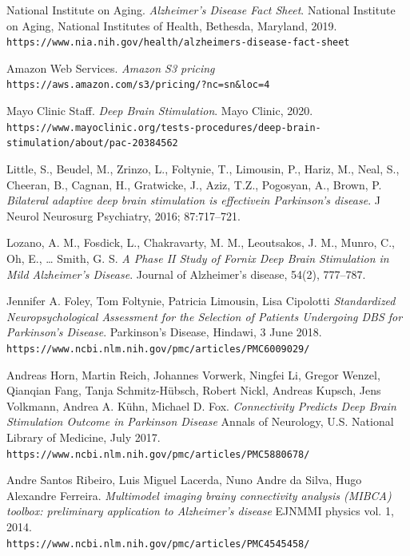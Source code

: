 \documentclass{article}
\begin{document}
\begin{thebibliography}{9}

National Institute on Aging. 
\textit{Alzheimer's Disease Fact Sheet}. 
National Institute on Aging, National Institutes of Health, Bethesda, Maryland, 2019.
\\\texttt{https://www.nia.nih.gov/health/alzheimers-disease-fact-sheet}

Amazon Web Services.
\textit{Amazon S3 pricing}
\\\texttt{https://aws.amazon.com/s3/pricing/?nc=sn\&loc=4}

Mayo Clinic Staff. 
\textit{Deep Brain Stimulation}. 
Mayo Clinic, 2020.
\\\texttt{https://www.mayoclinic.org/tests-procedures/deep-brain-stimulation/about/pac-20384562}

Little, S., Beudel, M., Zrinzo, L., Foltynie, T., Limousin, P., Hariz, M., Neal, S., Cheeran, B., Cagnan, H., Gratwicke, J., Aziz, T.Z., Pogosyan, A., Brown, P. 
\textit{Bilateral adaptive deep brain stimulation is effectivein Parkinson’s disease}. 
J Neurol Neurosurg Psychiatry, 2016; 87:717–721.

Lozano, A. M., Fosdick, L., Chakravarty, M. M., Leoutsakos, J. M., Munro, C., Oh, E., … Smith, G. S. 
\textit{A Phase II Study of Fornix Deep Brain Stimulation in Mild Alzheimer’s Disease}. 
Journal of Alzheimer's disease, 54(2), 777–787. 

Jennifer A. Foley, Tom Foltynie, Patricia Limousin, Lisa Cipolotti
\textit{Standardized Neuropsychological Assessment for the Selection of Patients Undergoing DBS for Parkinson's Disease}.
Parkinson's Disease, Hindawi, 3 June 2018.
\\\texttt{https://www.ncbi.nlm.nih.gov/pmc/articles/PMC6009029/}

Andreas Horn, Martin Reich, Johannes Vorwerk, Ningfei Li, Gregor Wenzel, Qianqian Fang, Tanja Schmitz-Hübsch, Robert Nickl, Andreas Kupsch, Jens Volkmann, Andrea A. Kühn, Michael D. Fox.
\textit{Connectivity Predicts Deep Brain Stimulation Outcome in Parkinson Disease}
Annals of Neurology, U.S. National Library of Medicine, July 2017.
\\\texttt{https://www.ncbi.nlm.nih.gov/pmc/articles/PMC5880678/}

Andre Santos Ribeiro, Luis Miguel Lacerda, Nuno Andre da Silva, Hugo Alexandre Ferreira.
\textit{Multimodel imaging brainy connectivity analysis (MIBCA) toolbox: preliminary application to Alzheimer's disease}
EJNMMI physics vol. 1, 2014.
\\\texttt{https://www.ncbi.nlm.nih.gov/pmc/articles/PMC4545458/}

\end{thebibliography}
\end{document}
